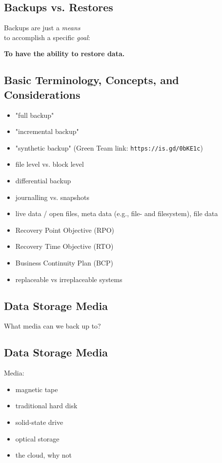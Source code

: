\documentclass[xga]{xdvislides}
\begin{document}
\subsection{Backups vs. Restores}
\Huge
\begin{center}

Backups are just a {\em means} \\
to accomplish a specific {\em goal}: \\

\vspace{.5in}

{\bf To have the ability to restore data.}
\end{center}
\Normalsize

\subsection{Basic Terminology, Concepts, and Considerations}
\begin{itemize}
	\item "full backup"
	\item "incremental backup"
	\item "synthetic backup" (Green Team link: \verb+https://is.gd/0bKE1c+)
	\item file level vs. block level
	\item differential backup
	\item journalling vs. snapshots
	\item live data / open files, meta data (e.g., file- and filesystem), file data
	\item Recovery Point Objective (RPO)
	\item Recovery Time Objective (RTO)
	\item Business Continuity Plan (BCP)
	\item replaceable vs irreplaceable systems
\end{itemize}

\subsection{Data Storage Media}
What media can we back up to?

\subsection{Data Storage Media}
Media:
\begin{itemize}
	\item magnetic tape 
	\item traditional hard disk
	\item solid-state drive
	\item optical storage
	\item the cloud, why not
\end{itemize}
\end{document}
